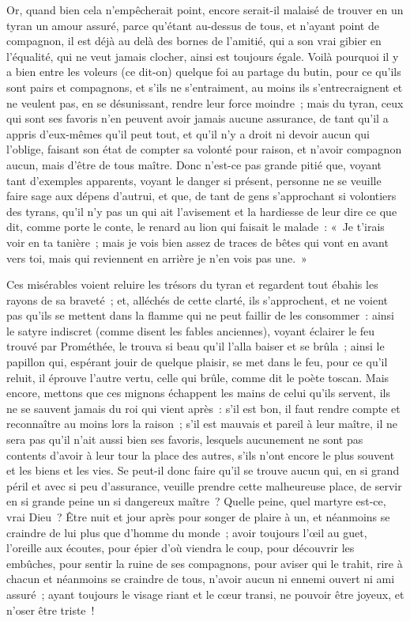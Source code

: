 \documentclass[french,twoside]{book} %
\begin{document}
Or, quand bien cela n’empêcherait point, encore serait-il malaisé de trouver en un tyran un amour assuré, parce qu’étant au-dessus de tous, et n’ayant point de compagnon, il est déjà au delà des bornes de l’amitié, qui a son vrai gibier en l’équalité, qui ne veut jamais clocher, ainsi est toujours égale. Voilà pourquoi il y a bien entre les voleurs (ce dit-on) quelque foi au partage du butin, pour ce qu’ils sont pairs et compagnons, et s’ils ne s’entraiment, au moins ils s’entrecraignent et ne veulent pas, en se désunissant, rendre leur force moindre ; mais du tyran, ceux qui sont ses favoris n’en peuvent avoir jamais aucune assurance, de tant qu’il a appris d’eux-mêmes qu’il peut tout, et qu’il n’y a droit ni devoir aucun qui l’oblige, faisant son état de compter sa volonté pour raison, et n’avoir compagnon aucun, mais d’être de tous maître. Donc n’est-ce pas grande pitié que, voyant tant d’exemples apparents, voyant le danger si présent, personne ne se veuille faire sage aux dépens d’autrui, et que, de tant de gens s’approchant si volontiers des tyrans, qu’il n’y pas un qui ait l’avisement et la hardiesse de leur dire ce que dit, comme porte le conte, le renard au lion qui faisait le malade : « Je t’irais voir en ta tanière ; mais je vois bien assez de traces de bêtes qui vont en avant vers toi, mais qui reviennent en arrière je n’en vois pas une. »\par
Ces misérables voient reluire les trésors du tyran et regardent tout ébahis les rayons de sa braveté ; et, alléchés de cette clarté, ils s’approchent, et ne voient pas qu’ils se mettent dans la flamme qui ne peut faillir de les consommer : ainsi le satyre indiscret (comme disent les fables anciennes), voyant éclairer le feu trouvé par Prométhée, le trouva si beau qu’il l’alla baiser et se brûla ; ainsi le papillon qui, espérant jouir de quelque plaisir, se met dans le feu, pour ce qu’il reluit, il éprouve l’autre vertu, celle qui brûle, comme dit le poète toscan. Mais encore, mettons que ces mignons échappent les mains de celui qu’ils servent, ils ne se sauvent jamais du roi qui vient après : s’il est bon, il faut rendre compte et reconnaître au moins lors la raison ; s’il est mauvais et pareil à leur maître, il ne sera pas qu’il n’ait aussi bien ses favoris, lesquels aucunement ne sont pas contents d’avoir à leur tour la place des autres, s’ils n’ont encore le plus souvent et les biens et les vies. Se peut-il donc faire qu’il se trouve aucun qui, en si grand péril et avec si peu d’assurance, veuille prendre cette malheureuse place, de servir en si grande peine un si dangereux maître ? Quelle peine, quel martyre est-ce, vrai Dieu ? Être nuit et jour après pour songer de plaire à un, et néanmoins se craindre de lui plus que d’homme du monde ; avoir toujours l’œil au guet, l’oreille aux écoutes, pour épier d’où viendra le coup, pour découvrir les embûches, pour sentir la ruine de ses compagnons, pour aviser qui le trahit, rire à chacun et néanmoins se craindre de tous, n’avoir aucun ni ennemi ouvert ni ami assuré ; ayant toujours le visage riant et le cœur transi, ne pouvoir être joyeux, et n’oser être triste !\par
\end{document}
